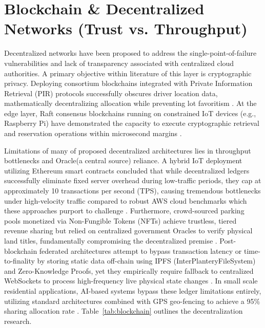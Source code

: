 \documentclass[conference]{IEEEtran}
\begin{document}
\section{Blockchain \& Decentralized Networks (Trust vs. Throughput)}
Decentralized networks have been proposed to address the single-point-of-failure vulnerabilities and lack of transparency associated with centralized cloud authorities. A primary objective within literature of this layer is cryptographic privacy. Deploying consortium blockchains integrated with Private Information Retrieval (PIR) protocols successfully obscures driver location data, mathematically decentralizing allocation while preventing lot favoritism \cite{b34}. At the edge layer, Raft consensus blockchains running on constrained IoT devices (e.g., Raspberry Pi) have demonstrated the capacity to execute cryptographic retrieval and reservation operations within microsecond margins \cite{b31}.

Limitations of many of proposed decentralized architectures lies in throughput bottlenecks and Oracle(a central source) reliance. A hybrid IoT deployment utilizing Ethereum smart contracts concluded that while decentralized ledgers successfully eliminate fixed server overhead during low-traffic periods, they cap at approximately 10 transactions per second (TPS), causing tremendous bottlenecks under high-velocity traffic compared to robust AWS cloud benchmarks which these approaches purport to challenge \cite{b27}. Furthermore, crowd-sourced parking pools monetized via Non-Fungible Tokens (NFTs) achieve trustless, tiered revenue sharing but relied on centralized government Oracles to verify physical land titles, fundamentally compromising the decentralized premise \cite{b26}. Post-blockchain federated architectures attempt to bypass transaction latency or time-to-finality by storing static data off-chain using IPFS (InterPlanteryFileSystem) and Zero-Knowledge Proofs, yet they empirically require fallback to centralized WebSockets to process high-frequency live physical state changes \cite{b39}. In small scale residential applications, AI-based systems bypass these ledger limitations entirely, utilizing standard architectures combined with GPS geo-fencing to achieve a 95\% sharing allocation rate \cite{b40}. Table~\ref{tab:blockchain} outlines the decentralization research.
\end{document}
